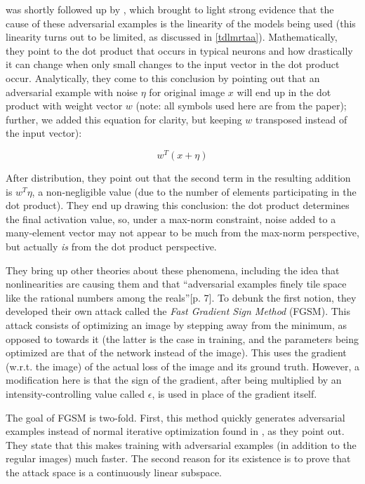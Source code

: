 \cite{szegedy2014intriguing} was shortly followed up by \cite{goodfellow2015explaining}, which
brought to light strong evidence that the cause of these adversarial examples is the linearity of
the models being used (this linearity turns out to be limited, as discussed in \ref{tdlmrtaa}).
Mathematically, they point to the dot product that occurs in typical neurons and how drastically it
can change when only small changes to the input vector in the dot product occur. Analytically, they
come to this conclusion by pointing out that an adversarial example with noise $\eta$ for original
image $x$ will end up in the dot product with weight vector $w$ (note: all symbols used here are
from the paper); further, we added this equation for clarity, but keeping $w$ transposed instead of
the input vector):

$$w^T(x + \eta)$$

After distribution, they point out that the second term in the resulting addition is $w^T\eta$, a
non-negligible value (due to the number of elements participating in the dot product). They
end up drawing this conclusion: the dot product determines the final activation value, so, under a
max-norm constraint, noise added to a many-element vector may not appear to be much from the
max-norm perspective, but actually \textit{is} from the dot product perspective.

They bring up other theories about these phenomena, including the idea that nonlinearities are
causing them and that ``adversarial examples finely tile space like the rational numbers among the
reals''\cite{goodfellow2015explaining}[p. 7]. To debunk the first notion, they developed their own
attack called the \textit{Fast Gradient Sign Method} (FGSM). This attack consists of optimizing an
image by stepping away from the minimum, as opposed to towards it (the latter is the case in
training, and the parameters being optimized are that of the network instead of the image). This
uses the gradient (w.r.t. the image) of the actual loss of the image and its ground truth. However,
a modification here is that the sign of the gradient, after being multiplied by an
intensity-controlling value called $\epsilon$, is used in place of the gradient itself.

The goal of FGSM is two-fold. First, this method quickly generates adversarial examples instead of
normal iterative optimization found in \cite{szegedy2014intriguing}, as they point out. They state
that this makes training with adversarial examples (in addition to the regular images) much faster.
The second reason for its existence is to prove that the attack space is a continuously linear
subspace.

